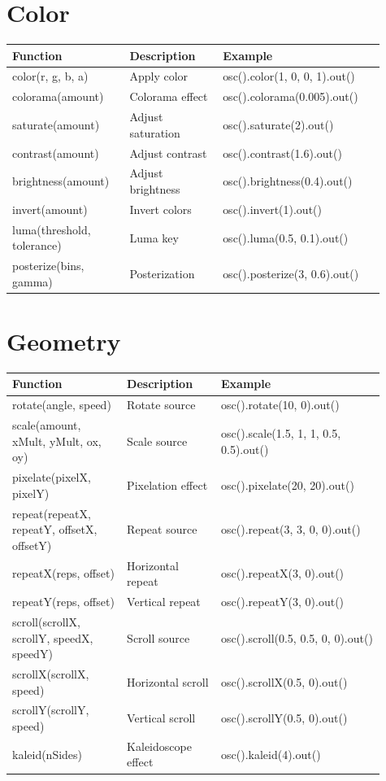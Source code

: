 \documentclass[9pt,oneside]{amsart}
\begin{document}
\section*{Color}
\begin{tabular}{L{0.28\linewidth}L{0.23\linewidth}L{0.40\linewidth}}
\toprule
\textbf{Function} & \textbf{Description} & \textbf{Example} \\
\midrule
color(r, g, b, a) & Apply color & osc().color(1, 0, 0, 1).out() \\
colorama(amount) & Colorama effect & osc().colorama(0.005).out() \\
saturate(amount) & Adjust saturation & osc().saturate(2).out() \\
contrast(amount) & Adjust contrast & osc().contrast(1.6).out() \\
brightness(amount) & Adjust brightness & osc().brightness(0.4).out() \\
invert(amount) & Invert colors & osc().invert(1).out() \\
luma(threshold, tolerance) & Luma key & osc().luma(0.5, 0.1).out() \\
posterize(bins, gamma) & Posterization & osc().posterize(3, 0.6).out() \\
\bottomrule
\end{tabular}

\section*{Geometry}
\begin{tabular}{L{0.28\linewidth}L{0.23\linewidth}L{0.40\linewidth}}
\toprule
\textbf{Function} & \textbf{Description} & \textbf{Example} \\
\midrule
rotate(angle, speed) & Rotate source & osc().rotate(10, 0).out() \\
scale(amount, xMult, yMult, ox, oy) & Scale source & osc().scale(1.5, 1, 1, 0.5, 0.5).out() \\
pixelate(pixelX, pixelY) & Pixelation effect & osc().pixelate(20, 20).out() \\
repeat(repeatX, repeatY, offsetX, offsetY) & Repeat source & osc().repeat(3, 3, 0, 0).out() \\
repeatX(reps, offset) & Horizontal repeat & osc().repeatX(3, 0).out() \\
repeatY(reps, offset) & Vertical repeat & osc().repeatY(3, 0).out() \\
scroll(scrollX, scrollY, speedX, speedY) & Scroll source & osc().scroll(0.5, 0.5, 0, 0).out() \\
scrollX(scrollX, speed) & Horizontal scroll & osc().scrollX(0.5, 0).out() \\
scrollY(scrollY, speed) & Vertical scroll & osc().scrollY(0.5, 0).out() \\
kaleid(nSides) & Kaleidoscope effect & osc().kaleid(4).out() \\
\bottomrule
\end{tabular}
\end{document}
